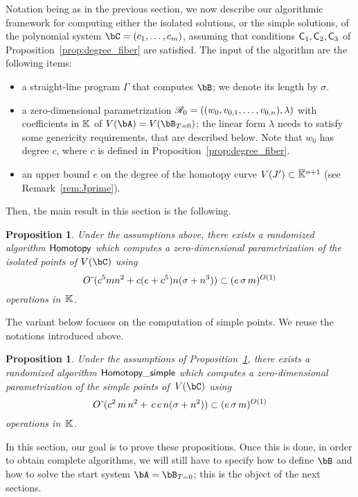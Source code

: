 \documentclass[12pt]{article}
\newtheorem{proposition}[definition]{Proposition}
\begin{document}
Notation being as in the previous section, we now describe our
algorithmic framework for computing either the isolated solutions, or
the simple solutions, of the polynomial system $\bC=(c_1,\dots,c_m)$,
assuming that conditions $\mathsf{C}_1,\mathsf{C}_2,\mathsf{C}_3$ of
Proposition~\ref{prop:degree_fiber} are satisfied. The input of the algorithm
are the following items:
\begin{itemize}
\item a straight-line program $\Gamma$ that computes $\bB$; we denote
  its length by $\sigma$.
\item a zero-dimensional parametrization $\mathscr{R}_0
  =((w_{0},v_{0,1},\dots,v_{0,n}),\lambda)$ with coefficients in $\mathbb{K}$
  of $V(\bA)=V(\bB_{T=0})$; the linear form $\lambda$ needs to satisfy some
  genericity requirements, that are described below. Note that $w_0$
  has degree $c$, where $c$ is defined in
  Proposition~\ref{prop:degree_fiber}.
\item an upper bound $e$ on the degree of the homotopy curve $V(J')
  \subset \overline{\mathbb{K}}{}^{n+1}$ (see Remark~\ref{rem:Jprime}).
\end{itemize}
Then, the main result in this section is the following.
\begin{proposition}\label{prop:compute_isolated}
  Under the assumptions above, there exists a randomized algorithm
  ${\sf Homotopy}$ which computes a zero-dimensional parametrization
  of the isolated points of $V(\bC)$ using
  $${O}{\,\tilde{ }\,}(c^5 m n^2  + c(e+c^5) n(\sigma + n^3)) \subset (e\,\sigma\,m)^{O(1)}$$
  operations in~$\mathbb{K}$. 
\end{proposition}
The variant below focuses on the computation of simple points. We
reuse the notations introduced above.
\begin{proposition}\label{prop:compute_regular}
  Under the assumptions of Proposition~\ref{prop:compute_isolated},
  there exists a randomized algorithm ${\sf Homotopy\_simple}$ which
  computes a zero-dimensional parametrization of the simple points
  of~$V(\bC)$ using
  $${O}{\,\tilde{ }\,}( c^2\, m \,n^2 + \,c\,e\,n (\sigma+n^2) )\subset (e\,\sigma\,m)^{O(1)}$$
  operations in~$\mathbb{K}$.
\end{proposition}
In this section, our goal is to prove these propositions. Once this is
done, in order to obtain complete algorithms, we will still have to
specify how to define $\bB$ and how to solve the start system
$\bA=\bB_{T=0}$; this is the object of the next sections.
\end{document}
